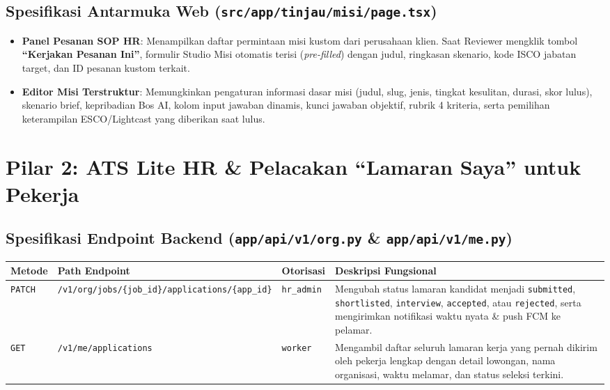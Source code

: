 \documentclass[11pt,a4paper]{report}
\begin{document}
\subsection{Spesifikasi Antarmuka Web (\texttt{src/app/tinjau/misi/page.tsx})}
\begin{itemize}[leftmargin=1.5em]
    \item \textbf{Panel Pesanan SOP HR}: Menampilkan daftar permintaan misi kustom dari perusahaan klien. Saat Reviewer mengklik tombol \textbf{``Kerjakan Pesanan Ini''}, formulir Studio Misi otomatis terisi (\textit{pre-filled}) dengan judul, ringkasan skenario, kode ISCO jabatan target, dan ID pesanan kustom terkait.
    \item \textbf{Editor Misi Terstruktur}: Memungkinkan pengaturan informasi dasar misi (judul, slug, jenis, tingkat kesulitan, durasi, skor lulus), skenario brief, kepribadian Bos AI, kolom input jawaban dinamis, kunci jawaban objektif, rubrik 4 kriteria, serta pemilihan keterampilan ESCO/Lightcast yang diberikan saat lulus.
\end{itemize}

\section{Pilar 2: ATS Lite HR \& Pelacakan ``Lamaran Saya'' untuk Pekerja}

\subsection{Spesifikasi Endpoint Backend (\texttt{app/api/v1/org.py} \& \texttt{app/api/v1/me.py})}
\begin{tabularx}{\textwidth}{L{2.0cm} L{6.2cm} L{2.2cm} X}
\toprule
\textbf{Metode} & \textbf{Path Endpoint} & \textbf{Otorisasi} & \textbf{Deskripsi Fungsional} \\
\midrule
\texttt{PATCH} & \texttt{/v1/org/jobs/\{job\_id\}/applications/\{app\_id\}} & \texttt{hr\_admin} & Mengubah status lamaran kandidat menjadi \texttt{submitted}, \texttt{shortlisted}, \texttt{interview}, \texttt{accepted}, atau \texttt{rejected}, serta mengirimkan notifikasi waktu nyata \& push FCM ke pelamar. \\
\texttt{GET} & \texttt{/v1/me/applications} & \texttt{worker} & Mengambil daftar seluruh lamaran kerja yang pernah dikirim oleh pekerja lengkap dengan detail lowongan, nama organisasi, waktu melamar, dan status seleksi terkini. \\
\bottomrule
\end{tabularx}
\end{document}
